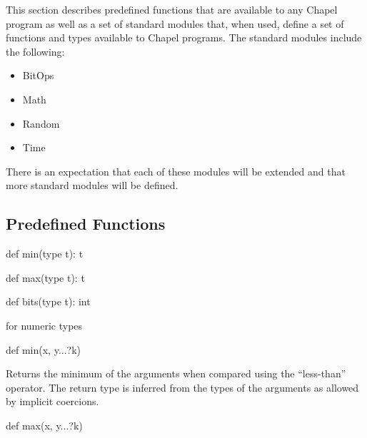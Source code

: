 \label{Standard_Modules}

This section describes predefined functions that are available to any
Chapel program as well as a set of standard modules that, when used,
define a set of functions and types available to Chapel programs.  The
standard modules include the following:
\begin{itemize}
\item BitOps
\item Math
\item Random
\item Time
\end{itemize}
There is an expectation that each of these modules will be extended
and that more standard modules will be defined.

\subsection{Predefined Functions}
\label{Predefined_Functions}



\begin{protohead}
def min(type t): t
\end{protohead}
\begin{protobody}
\end{protobody}

\begin{protohead}
def max(type t): t
\end{protohead}
\begin{protobody}
\end{protobody}

\begin{protohead}
def bits(type t): int
\end{protohead}
\begin{protobody}
for numeric types
\end{protobody}

\begin{protohead}
def min(x, y...?k)
\end{protohead}
\begin{protobody}
Returns the minimum of the arguments when compared using the
``less-than'' operator.  The return type is inferred from the types of
the arguments as allowed by implicit coercions.
\end{protobody}

\begin{protohead}
def max(x, y...?k)
\end{protohead}
\begin{protobody}
\end{protobody}

